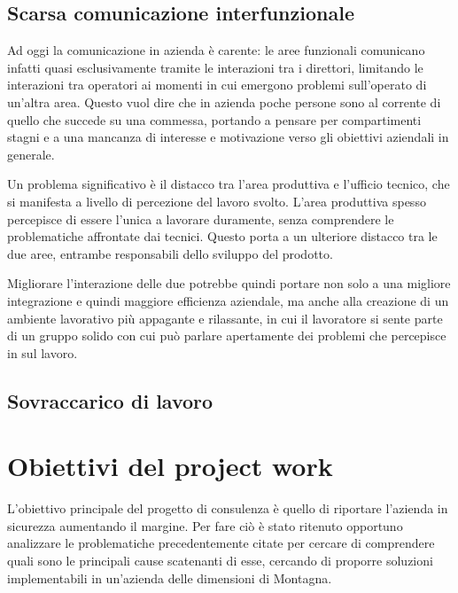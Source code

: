 \subsection{Scarsa comunicazione interfunzionale}
\begin{multicols}{2}
	Ad oggi la comunicazione in azienda è carente: le aree funzionali comunicano infatti quasi esclusivamente tramite le interazioni tra i direttori, limitando le interazioni tra operatori ai momenti in cui emergono problemi sull’operato di un’altra area.
	Questo vuol dire che in azienda poche persone sono al corrente di quello che succede su una commessa, portando a pensare per compartimenti stagni e a una mancanza di interesse e motivazione verso gli obiettivi aziendali in generale.

	Un problema significativo è il distacco tra l’area produttiva e l’ufficio tecnico, che si manifesta a livello di percezione del lavoro svolto. L’area produttiva spesso percepisce di essere l’unica a lavorare duramente, senza comprendere le problematiche affrontate dai tecnici. Questo porta a un ulteriore distacco tra le due aree, entrambe responsabili dello sviluppo del prodotto.

	Migliorare l’interazione delle due potrebbe quindi portare non solo a una migliore integrazione e quindi maggiore efficienza aziendale, ma anche alla creazione di un ambiente lavorativo più appagante e rilassante, in cui il lavoratore si sente parte di un gruppo solido con cui può parlare apertamente dei problemi che percepisce in sul lavoro.

\end{multicols}
\newpage

\subsection{Sovraccarico di lavoro}
\begin{multicols}{2}
  
  
\end{multicols}

\section{Obiettivi del project work}
\begin{multicols}{2}
	L’obiettivo principale del progetto di consulenza è quello di riportare l’azienda in sicurezza aumentando il margine. Per fare ciò è stato ritenuto opportuno analizzare le problematiche precedentemente citate per cercare di comprendere quali sono le principali cause scatenanti di esse, cercando di proporre soluzioni implementabili in un’azienda delle dimensioni di Montagna.
\end{multicols}
